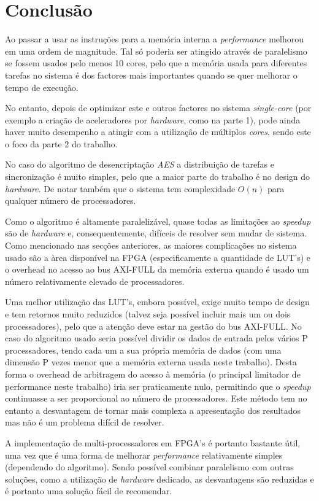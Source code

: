 \section{Conclusão}
Ao passar a usar as instruções para a memória interna a \textit{performance} melhorou em uma ordem de magnitude. Tal só poderia ser atingido através de paralelismo se fossem usados pelo menos 10 cores, pelo que a memória usada para diferentes tarefas no sistema é dos factores mais importantes quando se quer melhorar o tempo de execução.

No entanto, depois de optimizar este e outros factores no sistema \textit{single-core} (por exemplo a criação de aceleradores por \textit{hardware}, como na parte 1), pode ainda haver muito desempenho a atingir com a utilização de múltiplos \textit{cores}, sendo este o foco da parte 2 do trabalho.

No caso do algoritmo de desencriptação \textit{AES} a distribuição de tarefas e sincronização é muito simples, pelo que a maior parte do trabalho é no design do \textit{hardware}. De notar também que o sistema tem complexidade $O(n)$ para qualquer número de processadores.

Como o algoritmo é altamente paralelizável, quase todas as limitações ao \textit{speedup} são de \textit{hardware} e, consequentemente, difíceis de resolver sem mudar de sistema. Como mencionado nas secções anteriores, as maiores complicações no sistema usado são a àrea disponível na FPGA (especificamente a quantidade de LUT's) e o overhead no acesso ao bus AXI-FULL da memória externa quando é usado um número relativamente elevado de processadores. 

Uma melhor utilização das LUT's, embora possível, exige muito tempo de design e tem retornos muito reduzidos (talvez seja possível incluir mais um ou dois processadores), pelo que a atenção deve estar na gestão do bus AXI-FULL. No caso do algoritmo usado seria possível dividir os dados de entrada pelos vários P processadores, tendo cada um a sua própria memória de dados (com uma dimensão P vezes menor que a memória externa usada neste trabalho). Desta forma o overhead de arbitragem do acesso à memória (o principal limitador de performance neste trabalho) iria ser praticamente nulo, permitindo que o \textit{speedup} continuasse a ser proporcional ao número de processadores. Este método tem no entanto a desvantagem de tornar mais complexa a apresentação dos resultados mas não é um problema difícil de resolver.

A implementação de multi-processadores em FPGA's é portanto bastante útil, uma vez que é uma forma de melhorar \textit{performance} relativamente simples (dependendo do algoritmo). Sendo possível combinar paralelismo com outras soluções, como a utilização de \textit{hardware} dedicado, as desvantagens são reduzidas e é portanto uma solução fácil de recomendar.
